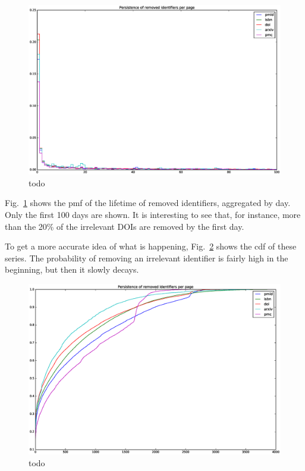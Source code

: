 \begin{figure}[h]
\centering
\includegraphics[keepaspectratio=true, width=\textwidth]{assets/persistence_removed_identifiers_pdf}
\caption{todo}
\label{fig:persistence_removed_identifiers_pdf}
\end{figure}

Fig.~\ref{fig:persistence_removed_identifiers_pdf} shows the \ac{pmf} of the lifetime of removed identifiers, aggregated by day.
Only the first 100 days are shown.
It is interesting to see that, for instance, more than the 20\% of the irrelevant \acp{DOI} are removed by the first day.

To get a more accurate idea of what is happening, Fig.~\ref{fig:persistence_removed_identifiers_cdf_days} shows the \ac{cdf} of these series.
The probability of removing an irrelevant identifier is fairly high in the beginning, but then it slowly decays.

\begin{figure}[h]
\centering
\includegraphics[keepaspectratio=true, width=\textwidth]{assets/persistence_removed_identifiers_cdf_days}
\caption{todo}
\label{fig:persistence_removed_identifiers_cdf_days}
\end{figure}

